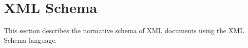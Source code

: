 
\section{XML Schema}%
\label{s:xmlschema}

This section describes the normative schema of XML documents using the XML Schema language.

